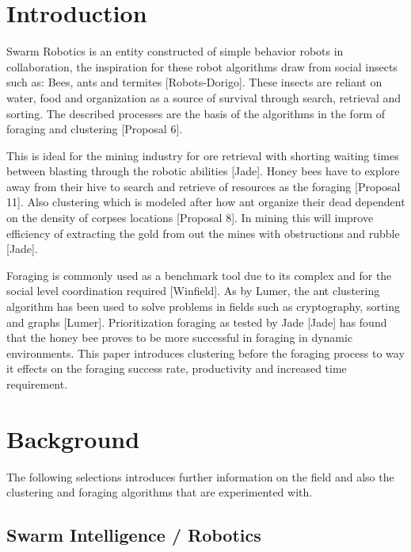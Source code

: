 \documentclass[12pt]{article}
\begin{document}
\section{Introduction}

\par{Swarm Robotics is an entity constructed of simple behavior  robots in collaboration, the inspiration for these robot algorithms draw from social insects such as: Bees, ants and termites [Robots-Dorigo]. These insects are reliant on water, food and organization as a source of survival through search, retrieval and sorting. The described processes are the basis of the algorithms in the form of foraging and clustering [Proposal 6].}

\par{This is ideal for the mining industry for ore retrieval with shorting waiting times between blasting through the robotic abilities [Jade]. Honey bees have to explore away from their hive to search and retrieve of resources as the foraging [Proposal 11]. Also clustering which is modeled after how ant organize their dead dependent on the density of corpses locations [Proposal 8]. In mining this will improve efficiency of extracting the gold from out the mines with obstructions and rubble [Jade].} 

\par{Foraging is commonly used as a benchmark tool due to its complex and for the social level coordination required [Winfield]. As by Lumer, the ant clustering algorithm has been used to solve problems in fields such as cryptography, sorting and graphs [Lumer]. Prioritization foraging as tested by Jade [Jade] has found that the honey bee proves to be more successful in foraging in dynamic environments. This paper introduces clustering before the foraging process to way it effects on the foraging success rate, productivity and increased time requirement.}

\section{Background}

The following selections introduces further information on the field and also the clustering and foraging algorithms that are experimented with.

\subsection{Swarm Intelligence / Robotics}
\end{document}
